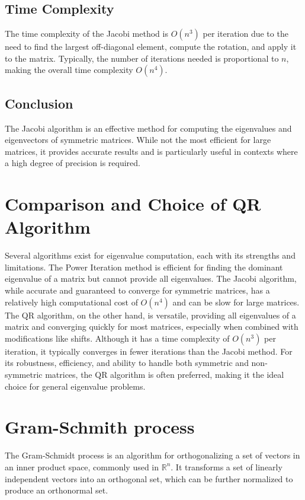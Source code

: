 \documentclass[journal]{IEEEtran}
\begin{document}
\subsection{Time Complexity}
The time complexity of the Jacobi method is $O(n^3)$ per iteration due to the need to find the largest off-diagonal element, compute the rotation, and apply it to the matrix. Typically, the number of iterations needed is proportional to $n$, making the overall time complexity $O(n^4)$.

\subsection{Conclusion}
The Jacobi algorithm is an effective method for computing the eigenvalues and eigenvectors of symmetric matrices. While not the most efficient for large matrices, it provides accurate results and is particularly useful in contexts where a high degree of precision is required.
\section{\textbf{Comparison and Choice of QR Algorithm}}
Several algorithms exist for eigenvalue computation, each with its strengths and limitations. The Power Iteration method is efficient for finding the dominant eigenvalue of a matrix but cannot provide all eigenvalues. The Jacobi algorithm, while accurate and guaranteed to converge for symmetric matrices, has a relatively high computational cost of $O(n^4)$ and can be slow for large matrices. The QR algorithm, on the other hand, is versatile, providing all eigenvalues of a matrix and converging quickly for most matrices, especially when combined with modifications like shifts. Although it has a time complexity of \(O(n^3)\) per iteration, it typically converges in fewer iterations than the Jacobi method. For its robustness, efficiency, and ability to handle both symmetric and non-symmetric matrices, the QR algorithm is often preferred, making it the ideal choice for general eigenvalue problems.
\section{\textbf{Gram-Schmith process}}
The Gram-Schmidt process is an algorithm for orthogonalizing a set of vectors in an inner product space, commonly used in $\mathbb{R}^n$. It transforms a set of linearly independent vectors into an orthogonal set, which can be further normalized to produce an orthonormal set.
\end{document}
